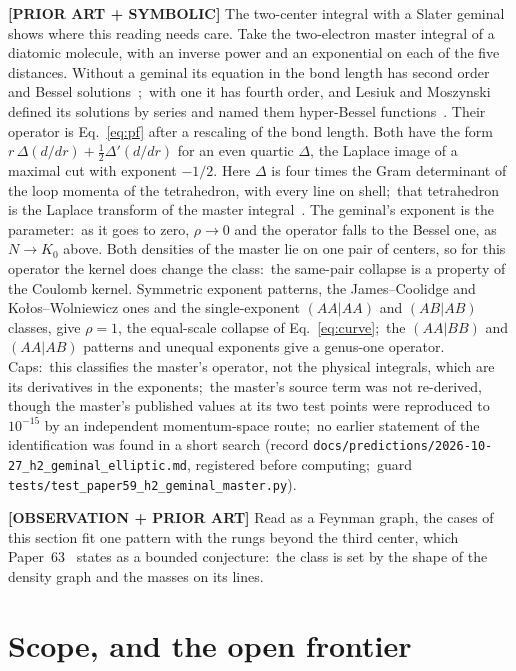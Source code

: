 \documentclass[aps,pra,twocolumn,superscriptaddress,longbibliography]{revtex4-2}
\begin{document}
\textbf{[PRIOR ART + SYMBOLIC]} The two-center integral with a Slater geminal shows where
this reading needs care.  Take the two-electron master integral of a diatomic molecule, with
an inverse power and an exponential on each of the five distances.  Without a geminal its
equation in the bond length has second order and Bessel solutions~\cite{pachucki2009};\ with
one it has fourth order, and Lesiuk and Moszynski defined its solutions by series and named
them hyper-Bessel functions~\cite{lesiuk2012}.  Their operator is Eq.~\eqref{eq:pf} after a
rescaling of the bond length.  Both have the form $r\,\Delta(d/dr)+\tfrac12\Delta'(d/dr)$
for an even quartic $\Delta$, the Laplace image of a maximal cut with exponent $-1/2$.  Here
$\Delta$ is four times the Gram determinant of the loop momenta of the tetrahedron, with
every line on shell;\ that tetrahedron is the Laplace transform of the master
integral~\cite{lesiuk2012}.  The geminal's exponent is the parameter:\ as it goes to zero,
$\rho\to0$ and the operator falls to the Bessel one, as $N\to K_{0}$ above.  Both densities of
the master lie on one pair of centers, so for this operator the kernel does change the class:\
the same-pair collapse is a property of the Coulomb kernel.  Symmetric exponent patterns, the
James--Coolidge and Ko\l{}os--Wolniewicz ones and the single-exponent $(AA|AA)$ and $(AB|AB)$
classes, give $\rho=1$, the equal-scale collapse of Eq.~\eqref{eq:curve};\ the $(AA|BB)$ and
$(AA|AB)$ patterns and unequal exponents give a genus-one operator.  Caps:\ this classifies
the master's operator, not the physical integrals, which are its derivatives in the
exponents;\ the master's source term was not re-derived, though the master's published values at its two
test points were reproduced to $10^{-15}$ by an independent momentum-space route;\ no
earlier statement of the identification was found in a short search (record
\texttt{docs/predictions/2026-10-27\_h2\_geminal\_elliptic.md}, registered before computing;\
guard \texttt{tests/test\_paper59\_h2\_geminal\_master.py}).

\textbf{[OBSERVATION + PRIOR ART]} Read as a Feynman graph, the cases of this
section fit one pattern with the rungs beyond the third center, which Paper~63~\cite{loutey_paper63}
states as a bounded conjecture:\ the class is set by the shape of the density graph and the
masses on its lines.
\section{Scope, and the open frontier}
\label{sec:scope}
\end{document}
